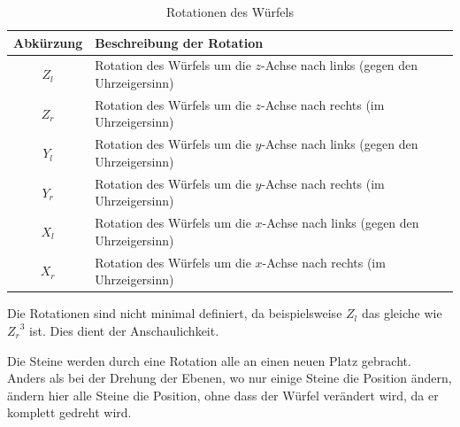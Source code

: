 \documentclass[12pt,a4paper, usenames, dvipsnames]{article}
\begin{document}
\begin{table}[H]

\begin{tabular}{|c|l|}
\hline
Abkürzung & Beschreibung der Rotation \\
\hline
\hline
$Z_l$ & Rotation des Würfels um die $z$-Achse nach links (gegen den Uhrzeigersinn)\\
\hline
$Z_r$ & Rotation des Würfels um die $z$-Achse nach rechts (im Uhrzeigersinn)  \\
\hline
$Y_l$ & Rotation des Würfels um die $y$-Achse nach links (gegen den Uhrzeigersinn)\\
\hline
$Y_r$ & Rotation des Würfels um die $y$-Achse nach rechts (im Uhrzeigersinn)  \\
\hline
$X_l$ & Rotation des Würfels um die $x$-Achse nach links (gegen den Uhrzeigersinn)\\
\hline
$X_r$ & Rotation des Würfels um die $x$-Achse nach rechts (im Uhrzeigersinn) \\
\hline
\end{tabular} 
\caption[Rotationen des Würfels]{Rotationen des Würfels}
\end{table}

Die Rotationen sind nicht minimal definiert, da beispielsweise $Z_l$ das gleiche wie ${Z_r}^3$ ist. Dies dient der Anschaulichkeit. 

Die Steine werden durch eine Rotation alle an einen neuen Platz gebracht. Anders als bei der Drehung der Ebenen, wo nur einige Steine die Position ändern, ändern hier alle Steine die Position, ohne dass der Würfel verändert wird, da er komplett gedreht wird. 
\end{document}
